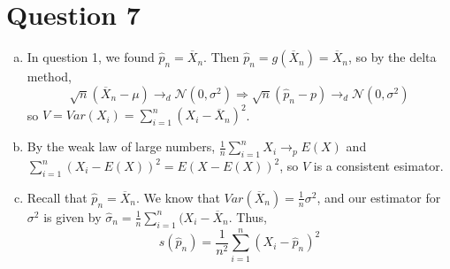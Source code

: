 \documentclass{article}
\newcommand{\N}{\mathcal{N}}
\newcommand{\olx}[1]{\overline{X}_{#1}}
\newcommand{\est}[1]{\frac{1}{#1}\sum_{i=1}^{#1}}
\begin{document}

\section*{Question 7}
\begin{enumerate}[(a)]
	\item In question 1, we found $\hat{p}_n=\olx{n}$. Then $\hat{p}_n=g(\olx{n})=\olx{n}$, so by the delta method,
		\[
			\sqrt{n}(\olx{n}-\mu)\rightarrow_d\N(0,\sigma^2)\Rightarrow\sqrt{n}(\hat{p}_n-p)\rightarrow_d\N(0,\sigma^2)
		\]
		so $V=Var(X_i)=\sum_{i=1}^n(X_i-\olx{n})^2$.
		
		\item By the weak law of large numbers, $\est{n}X_i\rightarrow_p E(X)$ and $\sum_{i=1}^n(X_i-E(X))^2 = E(X-E(X))^2$, so $V$ is a consistent esimator.
		
		\item Recall that $\hat{p}_n=\olx{n}$. We know that $Var(\olx{n})=\frac{1}{n}\sigma^2$, and our estimator for $\sigma^2$ is given by ${\hat{\sigma}_n=\est{n}(X_i-\olx{n}}$. Thus,
			\[
				s(\hat{p}_n) = \frac{1}{n^2}\sum_{i=1}^n(X_i-\hat{p}_n)^2
			\]
\end{enumerate}


\end{document}
